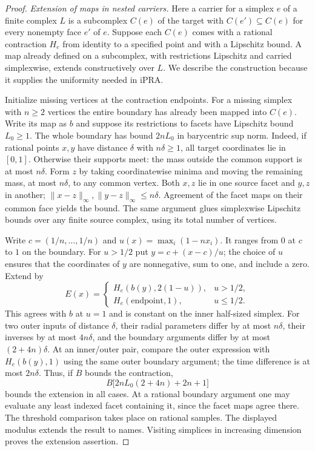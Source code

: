 \begin{proof}
\emph{Extension of maps in nested carriers.}
Here a carrier for a simplex $e$ of a finite complex $L$ is a
subcomplex $C(e)$ of the target with $C(e')\subseteq C(e)$ for every
nonempty face $e'$ of $e$. Suppose each $C(e)$ comes with a rational
contraction $H_e$ from identity to a specified point and with a Lipschitz
bound. A map already defined on a subcomplex, with restrictions Lipschitz
and carried simplexwise, extends constructively over $L$. We describe
the construction because it supplies the uniformity needed in iPRA.

Initialize missing vertices at the contraction endpoints. For a missing
simplex with $n\ge2$ vertices the entire boundary has already been mapped
into $C(e)$. Write its map as $b$ and suppose its restrictions to facets
have Lipschitz bound $L_0\ge1$. The whole boundary has bound $2nL_0$
in barycentric sup norm. Indeed, if rational points $x,y$ have distance
$\delta$ with $n\delta\ge1$, all target coordinates lie in $[0,1]$.
Otherwise their supports meet: the mass outside the common support is at
most $n\delta$. Form $z$ by taking coordinatewise minima and moving
the remaining mass, at most $n\delta$, to any common vertex.
Both $x,z$ lie in one source facet and $y,z$ in another;
$\|x-z\|_\infty,\|y-z\|_\infty\le n\delta$.
Agreement of the facet maps on their common face yields the bound.
The same argument glues simplexwise Lipschitz bounds over any finite
source complex, using its total number of vertices.

Write $c=(1/n,\ldots,1/n)$ and
$u(x)=\max_i(1-n x_i)$. It ranges from $0$ at $c$ to $1$ on the
boundary. For $u>1/2$ put $y=c+(x-c)/u$; the choice of $u$ ensures
that the coordinates of $y$ are nonnegative, sum to one, and include
a zero. Extend by
\[
  E(x)=
  \begin{cases}
    H_e(b(y),2(1-u)),&u>1/2,\\
    H_e(\text{endpoint},1),&u\le1/2.
  \end{cases}
\]
This agrees with $b$ at $u=1$ and is constant on the inner half-sized
simplex. For two outer inputs of distance $\delta$, their radial
parameters differ by at most $n\delta$, their inverses by at most
$4n\delta$, and the boundary arguments differ by at most
$(2+4n)\delta$. At an inner/outer pair, compare the outer expression
with $H_e(b(y),1)$ using the same outer boundary argument; the time
difference is at most $2n\delta$. Thus, if $B$ bounds the contraction,
\[
 B\bigl[2nL_0(2+4n)+2n+1\bigr]
\]
bounds the extension in all cases. At a rational boundary argument one
may evaluate any least indexed facet containing it, since the facet
maps agree there. The threshold comparison takes place on rational
samples. The displayed modulus extends the result to names. Visiting
simplices in increasing dimension proves the extension assertion.


\end{proof}

